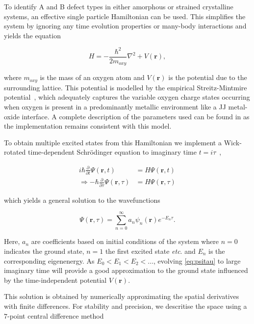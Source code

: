 To identify A and B defect types in either amorphous or strained crystalline systems, an effective single particle Hamiltonian can be used.
This simplifies the system by ignoring any time evolution properties or many-body interactions and yields the equation

\begin{equation}
    H = -\frac{\hbar^2}{2m_{oxy}}\nabla^2+V(\mathbf{r}),
\end{equation}

where $m_{oxy}$ is the mass of an oxygen atom and $V(\mathbf{r})$ is the potential due to the surrounding lattice.
This potential is modelled by the empirical Streitz-Mintmire potential~\cite{Streitz1994,Zhou2004}, which adequately captures the variable oxygen charge states occurring when oxygen is present in a predominantly metallic environment like a JJ metal-oxide interface.
A complete description of the parameters used can be found in  as the implementation remains consistent with this model.

To obtain multiple excited states from this Hamiltonian we implement a Wick-rotated time-dependent Schr\"{o}dinger equation to imaginary time $t=i\tau$~\cite{Strickland2010},

\begin{align}
i \hbar \frac{\partial}{\partial t}\Psi(\mathbf{r},t) &= H\Psi(\mathbf{r},t)\\
\Rightarrow - \hbar \frac{\partial}{\partial \tau}\Psi(\mathbf{r},\tau) &= H\Psi(\mathbf{r},\tau)
\end{align}

which yields a general solution to the wavefunctions

\begin{equation}
\Psi(\mathbf{r},\tau) = \sum_{n=0}^\infty a_n\psi_n(\mathbf{r})e^{-E_n \tau}.\label{eq:psitau}
\end{equation}

Here, ${a_n}$ are coefficients based on initial conditions of the system where $n=0$ indicates the ground state, $n=1$ the first excited state \textit{etc}. and $E_n$ is the corresponding eigenenergy.
As $E_0 < E_1 < E_2 < \ldots$, evolving \cref{eq:psitau} to large imaginary time will provide a good approximation to the ground state influenced by the time-independent potential $V(\mathbf{r})$.

This solution is obtained by numerically approximating the spatial derivatives with finite differences.
For stability and precision, we descritise the space using a $7$-point central difference method

